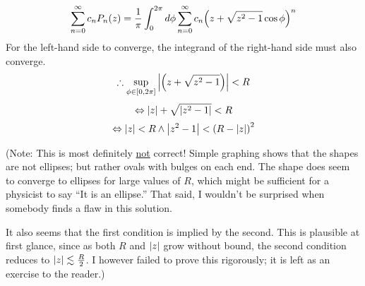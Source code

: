 \item

\[
    \sum_{n = 0}^\infty c_n P_n(z)
    = \frac{1}{\pi} \int_0^{2\pi} d\phi \sum_{n = 0}^\infty
       c_n {\left(z + \sqrt{z^2 - 1}\cos\phi\right)}^n
\]
For the left-hand side to converge,
the integrand of the right-hand side must also converge.
\[
    \therefore \sup_{\phi\in[0,2\pi]} \left| \left(z + \sqrt{z^2 - 1}\right) \right| < R
\]
\[
    \Leftrightarrow \left| z \right| + \sqrt{\left| z^2 - 1 \right|} < R
\]
\[
    \Leftrightarrow \left| z \right| < R \wedge \left| z^2 - 1 \right| < {\left( R - \left| z \right| \right)}^2
\]

(Note: This is most definitely \underline{not} correct!
Simple graphing shows that the shapes are not ellipses;
but rather ovals with bulges on each end.
The shape does seem to converge to ellipses for large values of $R$,
which might be sufficient for a physicist to say ``It is an ellipse.''
That said, I wouldn't be surprised when somebody finds a flaw in this solution.

It also seems that the first condition is implied by the second.
This is plausible at first glance, since as both $R$ and $\left| z \right|$ grow without bound,
the second condition reduces to $\left| z \right| \lesssim \frac{R}{2}$.
I however failed to prove this rigorously;
it is left as an exercise to the reader.)
